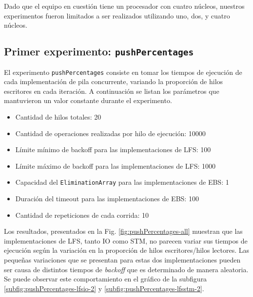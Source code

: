 Dado que el equipo en cuestión tiene un procesador con cuatro núcleos, nuestros experimentos fueron limitados a ser realizados utilizando uno, dos, y cuatro núcleos.

\subsection{Primer experimento: \texttt{pushPercentages}}\label{subsec:pushPercentages}
El experimento \texttt{pushPercentages} consiste en tomar los tiempos de ejecución de cada implementación de pila concurrente, variando la proporción de hilos escritores en cada iteración.
A continuación se listan los parámetros que mantuvieron un valor constante durante el experimento.

\begin{itemize}
    \item Cantidad de hilos totales: 20
    \item Cantidad de operaciones realizadas por hilo de ejecución: 10000
    \item Límite mínimo de backoff para las implementaciones de LFS: 100
    \item Límite máximo de backoff para las implementaciones de LFS: 1000
    \item Capacidad del \texttt{EliminationArray} para las implementaciones de EBS: 1
    \item Duración del timeout para las implementaciones de EBS: 100
    \item Cantidad de repeticiones de cada corrida: 10
\end{itemize}

Los resultados, presentados en la Fig. \ref{fig:pushPercentages-all} muestran que las implementaciones de LFS, tanto IO como STM, no parecen variar sus tiempos de ejecución según la variación en la proporción de hilos escritores/hilos lectores.
Las pequeñas variaciones que se presentan para estas dos implementaciones pueden ser causa de distintos tiempos de \emph{backoff} que es determinado de manera aleatoria. Se puede observar este comportamiento en el gráfico de la subfigura \ref{subfig:pushPercentages-lfsio-2} y \ref{subfig:pushPercentages-lfsstm-2}.

